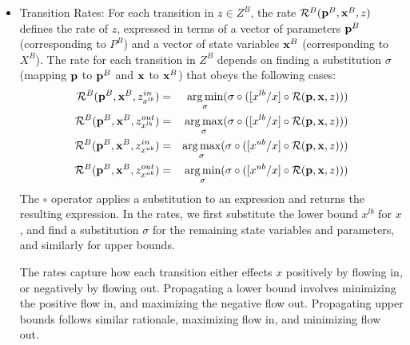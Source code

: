 \begin{definition}
\begin{itemize}
            
            \item Transition Rates: For each transition in $z \in Z^B$, the rate ${\cal R}^B({\bf
            p}^B, {\bf x}^B, z)$ defines the rate of $z$, expressed in terms of a vector of parameters ${\bf
            p}^B$ (corresponding to $P^B$) and a vector of state variables ${\bf x}^B$ (corresponding to $X^B$). The rate for each transition in $Z^B$ depends on finding a substitution $\sigma$ (mapping ${\bf
            p}$ to ${\bf
            p}^B$ and ${\bf x}$ to ${\bf x}^B$) that obeys the following cases:
            \begin{eqnarray*}
                {\cal R}^B({\bf p}^B, {\bf x}^B, z^{in}_{x^{lb}}) &=&  \operatorname*{arg\,min}_{\sigma} (\sigma \circ ([x^{lb}/x] \circ  {\cal R}({\bf p}, {\bf x}, z) ))\\ 
                {\cal R}^B({\bf p}^B, {\bf x}^B, z^{out}_{x^{lb}}) &=&  \operatorname*{arg\,max}_{\sigma} (\sigma \circ ([x^{lb}/x] \circ  {\cal R}({\bf p}, {\bf x}, z) ))\\
                {\cal R}^B({\bf p}^B, {\bf x}^B, z^{in}_{x^{ub}}) &=&  \operatorname*{arg\,max}_{\sigma} (\sigma \circ ([x^{ub}/x] \circ  {\cal R}({\bf p}, {\bf x}, z) ))\\
                {\cal R}^B({\bf p}^B, {\bf x}^B, z^{out}_{x^{ub}}) &=& \operatorname*{arg\,min}_{\sigma} (\sigma \circ ([x^{ub}/x] \circ  {\cal R}({\bf p}, {\bf x}, z) ))
            \end{eqnarray*}
            The $\circ$ operator applies a substitution to an expression and returns the resulting expression.  In the rates, we first substitute the lower bound $x^{lb}$ for $x$, and find a substitution $\sigma$ for the remaining state variables and parameters, and similarly for upper bounds.

            The rates capture how each transition either effects $x$ positively by flowing in, or negatively by flowing out.  Propagating a lower bound involves minimizing the positive flow in, and maximizing the negative flow out.  Propagating upper bounds follows similar rationale, maximizing flow in, and minimizing flow out.  
            
    \end{itemize}
        
    \end{definition}

